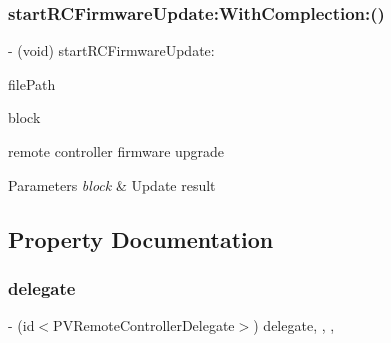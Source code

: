 \subsubsection{\texorpdfstring{start\+R\+C\+Firmware\+Update\+:\+With\+Complection\+:()}{startRCFirmwareUpdate:WithComplection:()}}
{\footnotesize\ttfamily -\/ (void) start\+R\+C\+Firmware\+Update\+: \begin{DoxyParamCaption}\item[{(N\+S\+String $\ast$\hyperlink{group___p_v_s_d_k___c_o_r_e___a_p_i___m_o_u_n_t_c_o_n_t_r_o_l_ga5a1de33b230662127568783314b4a54d}{\+\_\+\+Nullable})}]{file\+Path }\item[{WithComplection:(void($^\wedge$)(P\+V\+Firmware\+Upgrade\+State upgrade\+State, N\+S\+Integer upgrade\+Process, N\+S\+Error $\ast$\hyperlink{group___p_v_s_d_k___c_o_r_e___a_p_i___m_o_u_n_t_c_o_n_t_r_o_l_ga5a1de33b230662127568783314b4a54d}{\+\_\+\+Nullable} N\+S\+Error))}]{block }\end{DoxyParamCaption}}

remote controller firmware upgrade


\begin{DoxyParams}{Parameters}
{\em block} & Update result \\
\hline
\end{DoxyParams}


\subsection{Property Documentation}
\mbox{\label{interface_p_v_remote_controller_adf6bba42ff7feddd27a36eb8d060826e}} 
\subsubsection{\texorpdfstring{delegate}{delegate}}
{\footnotesize\ttfamily -\/ (id$<$P\+V\+Remote\+Controller\+Delegate$>$) delegate\hspace{0.3cm}{\ttfamily [read]}, {\ttfamily [write]}, {\ttfamily [nonatomic]}, {\ttfamily [weak]}}

\mbox{\label{interface_p_v_remote_controller_ac44e638ddad2e2ec1b5d8f1f99998308}} 
